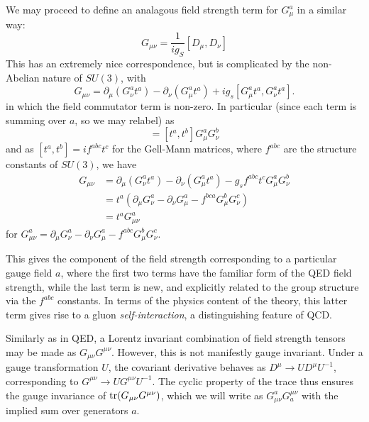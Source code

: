 We may proceed to define an analagous field strength term for $G_{\mu}^{a}$ in a similar way:
\begin{equation}
G_{\mu\nu} = \frac{1}{ig_{S}}[D_{\mu}, D_{\nu}]
\end{equation}
This has an extremely nice correspondence, but is complicated by the non-Abelian nature of $SU(3)$, with
\begin{equation}
G_{\mu\nu} = \partial_{\mu}(G_{\nu}^{a}t^{a}) - \partial_{\nu}(G_{\mu}^{a}t^{a}) + ig_{s}[G_{\mu}^{a}t^{a}, G_{\nu}^{a}t^{a}].
\end{equation}
in which the field commutator term is non-zero. In particular (since each term is summing over $a$, so we may relabel) as
\begin{equation} 
[G_{\mu}^{a}t^{a}, G_{\nu}^{b}t^{b}] = [t^{a}, t^{b}]G_{\mu}^{a}G_{\nu}^{b}
\end{equation}
and as $[t^{a}, t^{b}] = if^{abc}t^c$ for the Gell-Mann matrices, where $f^{abc}$ are the structure
constants of $SU(3)$, we have
\begin{align}
G_{\mu\nu} &= \partial_{\mu}(G_{\nu}^{a}t^{a}) - \partial_{\nu}(G_{\mu}^{a}t^{a}) -g_{s}f^{abc}t^cG_{\mu}^{a}G_{\nu}^{b}\\
&=t^{a}(\partial_{\mu}G_{\nu}^{a}-\partial_{\nu}G_{\mu}^{a}-f^{bca}G_{\mu}^{b}G_{\nu}^{c})\\
&=t^{a}G_{\mu\nu}^a
\end{align}
for $G_{\mu\nu}^a = \partial_{\mu}G_{\nu}^{a}-\partial_{\nu}G_{\mu}^{a}-f^{abc}G_{\mu}^{b}G_{\nu}^{c}$.

This gives the component of the field strength corresponding to a particular gauge field $a$, where 
the first two terms have the familiar form of the QED field strength, while the last term is new, and 
explicitly related to the group structure via the $f^{abc}$ constants. In terms of the physics content of the 
theory, this latter term gives rise to a gluon \emph{self-interaction}, a distinguishing feature of QCD.

Similarly as in QED, a Lorentz invariant combination of field strength tensors may be made as $G_{\mu\nu}G^{\mu\nu}$.
However, this is not manifestly gauge invariant. Under a gauge transformation $U$, the covariant derivative 
behaves as $D^{\mu}\rightarrow UD^{\mu}U^{-1}$, corresponding to $G^{\mu\nu}\rightarrow UG^{\mu\nu}U^{-1}$.
The cyclic property of the trace thus ensures the gauge invariance of $\tr(G_{\mu\nu}G^{\mu\nu})$, which we 
will write as $G_{\mu\nu}^a G^{\mu\nu}_a$ with the implied sum over generators $a$.

